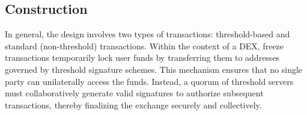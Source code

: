 \subsection{Construction}
In general, the design involves two types of transactions: threshold-based and standard (non-threshold) transactions. Within the context of a DEX, freeze transactions temporarily lock user funds by transferring them to addresses governed by threshold signature schemes. This mechanism ensures that no single party can unilaterally access the funds. Instead, a quorum of threshold servers must collaboratively generate valid signatures to authorize subsequent transactions, thereby finalizing the exchange securely and collectively. 

\newpage
